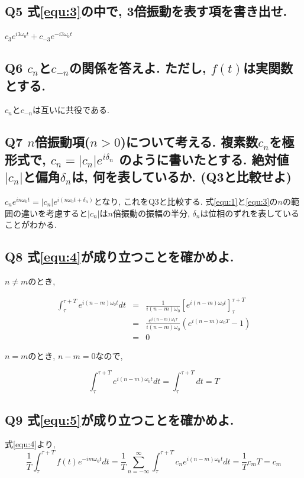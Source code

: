 \documentclass[titlepage]{jsarticle}
\begin{document}
    \subsection{Q5 式\ref{equ:3}の中で, 3倍振動を表す項を書き出せ.}
        $c_3e^{i3\omega_0t}+c_{-3}e^{-i3\omega_0t}$

    \subsection{Q6 $c_n$と$c_{-n}$の関係を答えよ. ただし, $f(t)$は実関数とする.}
        $c_n$と$c_{-n}$は互いに共役である.

    \subsection{Q7 $n$倍振動項($n>0$)について考える. 複素数$c_n$を極形式で,
        $c_n=|c_n|e^{i\delta_n}$
        のように書いたとする.
        絶対値$|c_n|$と偏角$\delta_n$は, 何を表しているか. (Q3と比較せよ)}

        $c_ne^{in\omega_0t}=|c_n|e^{i(n\omega_0t+\delta_n)}$となり,
        これをQ3と比較する.
        式\ref{equ:1}と\ref{equ:3}の$n$の範囲の違いを考慮すると$|c_n|$は$n$倍振動の振幅の半分,
        $\delta_n$は位相のずれを表していることがわかる.

    \subsection{Q8 式\ref{equ:4}が成り立つことを確かめよ.}
        $n \neq m$のとき,

        \begin{eqnarray}
            \int_\tau^{\tau+T}e^{i(n-m)\omega_0t}dt&=&\frac{1}{i(n-m)\omega_0}\left[e^{i(n-m)\omega_0t}\right]_\tau^{\tau+T}\nonumber\\
            &=&\frac{e^{i(n-m)\omega_0\tau}}{i(n-m)\omega_0}\left(e^{i(n-m)\omega_0T}-1\right)\nonumber\\
            &=&0\nonumber
        \end{eqnarray}

        $n=m$のとき, $n-m=0$なので,

        \begin{equation*}
            \int_\tau^{\tau+T}e^{i(n-m)\omega_0t}dt=\int_\tau^{\tau+T}dt=T
        \end{equation*}

    \subsection{Q9 式\ref{equ:5}が成り立つことを確かめよ.}
        式\ref{equ:4}より,
        \begin{equation*}
            \frac{1}{T}\int_\tau^{\tau+T}f(t)e^{-im\omega_0t}dt
            = \frac{1}{T}\sum^\infty_{n=-\infty}\int^{\tau+T}_{\tau}c_ne^{i(n-m)\omega_0t}dt
            = \frac{1}{T}c_mT=c_m
        \end{equation*}
\end{document}
